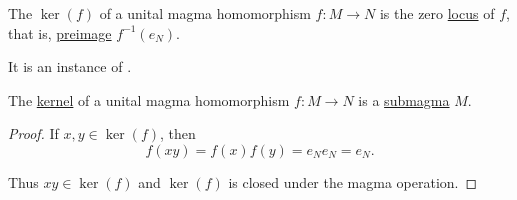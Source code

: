 \begin{definition}\label{def:unital_magma_kernel}
  The  \( \ker(f) \) of a unital magma homomorphism \( f: M \to N \) is the zero \hyperref[def:zero_locus]{locus} of \( f \), that is, \hyperref[def:function/preimage]{preimage} \( f^{-1}(e_N) \).

  It is an instance of .
\end{definition}

\begin{proposition}\label{thm:unital_magma_kernel_is_submagma}
  The \hyperref[def:unital_magma_kernel]{kernel} of a unital magma homomorphism \( f: M \to N \) is a \hyperref[def:first_order_substructure]{submagma} \( M \).
\end{proposition}
\begin{proof}
  If \( x, y \in \ker(f) \), then
  \begin{equation*}
    f(xy) = f(x) f(y) = e_N e_N = e_N.
  \end{equation*}

  Thus \( xy \in \ker(f) \) and \( \ker(f) \) is closed under the magma operation.
\end{proof}

